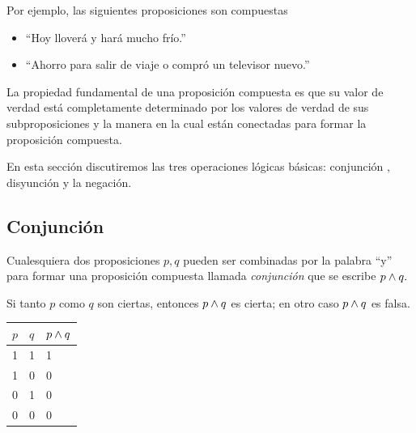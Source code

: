     Por ejemplo, las siguientes proposiciones son compuestas
    \begin{itemize}
        \item ``Hoy lloverá y hará mucho frío.''
        \item ``Ahorro para salir de viaje o compró un televisor nuevo.''
    \end{itemize}




    La propiedad fundamental de una proposición compuesta es que su valor de verdad está completamente determinado por los valores de verdad de sus subproposiciones y la manera en la cual están conectadas para formar la proposición compuesta.


    En esta sección discutiremos las tres operaciones lógicas básicas: conjunción , disyunción  y la negación.


\subsection{Conjunción}


    Cualesquiera dos proposiciones $p,q$ pueden ser combinadas por la palabra ``y'' para formar una proposición compuesta llamada \emph{conjunción} que se escribe $p\wedge q.$



    \begin{definicion}
        Si tanto $p$ como $q$ son ciertas, entonces $p \wedge q$ es cierta; en otro caso $p\wedge q$ es falsa.
    \end{definicion}

	\begin{tdv}[Conjunción]\hfill
		\label{tdv:and}
		\begin{center}
			\begin{tabular}{|l|l|l|}\hline
				$p$ & $q$ & $p \wedge q$\\\hline
				1 & 1 & 1\\\hline
				1 & 0 & 0\\\hline
				0 & 1 & 0\\\hline
				0 & 0 & 0\\\hline
			\end{tabular}
		\end{center}
	\end{tdv}



